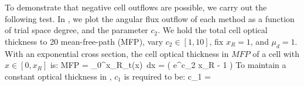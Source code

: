 
To demonstrate that negative cell outflows are possible, we carry out the following test.
In , we plot the angular flux outflow of each method as a function of trial space degree, and the parameter $c_2$.
We hold the total cell optical thickness to 20 mean-free-path (MFP), vary $c_2 \in [1,10]$, fix $x_R=1$, and $\mu_d =1$.
With an exponential cross section, the cell optical thickness in $MFP$ of a cell  with $x\in[0,x_R]$ is:
\benum
MFP = \int_{0}^{x_R}{\Sigma_t(x)~dx} = \left( e^{c_2 x_R} - 1 \right) \pep
\label{eq:chap3_mfp_tot} 
\eenum
To maintain a constant optical thickness in , $c_1$ is required to be:
\benum
c_1 = \pep
\eenum

